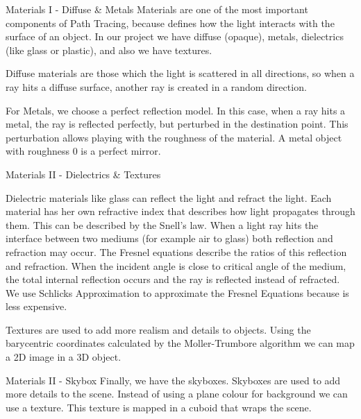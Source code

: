 \documentclass{beamer}
\begin{document}
\begin{frame}{Materials I - Diffuse \& Metals}
Materials are one of the most important components of Path Tracing, because defines how the light interacts with the surface of an object. In our project we have diffuse (opaque), metals, dielectrics (like glass or plastic), and also we have textures.

Diffuse materials are those which the light is scattered in all directions, so when a ray hits a diffuse surface, another ray is created in a random direction.

For Metals, we choose a perfect reflection model. In this case, when a ray hits a metal, the ray is reflected perfectly, but perturbed in the destination point. This perturbation allows playing with the roughness of the material. A metal object with roughness 0 is a perfect mirror.

\end{frame}

\begin{frame}{Materials II - Dielectrics \& Textures}

Dielectric materials like glass can reflect the light and refract the light. Each material has her own refractive index that describes how light propagates through them. This can be described by the Snell’s law. When a light ray hits the interface between two mediums (for example air to glass) both reflection and refraction may occur. The Fresnel equations describe the ratios of this reflection and refraction. When the incident angle is close to critical angle of the medium, the total internal reflection occurs and the ray is reflected instead of refracted. We use Schlicks Approximation to approximate the Fresnel Equations because is less expensive.

Textures are used to add more realism and details to objects. Using the barycentric coordinates calculated by the Moller-Trumbore algorithm we can map a 2D image in a 3D object.

\end{frame}

\begin{frame}{Materials II - Skybox}
Finally, we have the skyboxes. Skyboxes are used to add more details to the scene. Instead of using a plane colour for background we can use a texture. This texture is mapped in a cuboid that wraps the scene.
\end{frame}
\end{document}
